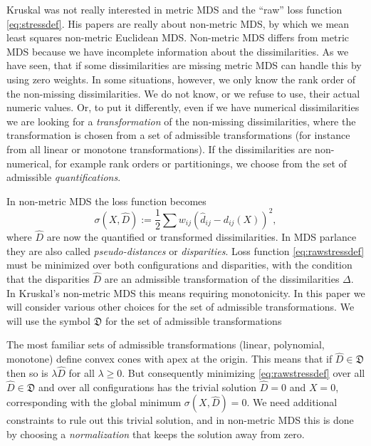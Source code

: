 \documentclass[
  12pt,
]{article}
\begin{document}
Kruskal was not really interested in metric MDS and the ``raw'' loss
function \eqref{eq:stressdef}. His papers are really about non-metric
MDS, by which we mean least squares non-metric Euclidean MDS. Non-metric
MDS differs from metric MDS because we have incomplete information about
the dissimilarities. As we have seen, that if some dissimilarities are
missing metric MDS can handle this by using zero weights. In some
situations, however, we only know the rank order of the non-missing
dissimilarities. We do not know, or we refuse to use, their actual
numeric values. Or, to put it differently, even if we have numerical
dissimilarities we are looking for a \emph{transformation} of the non-missing
dissimilarities, where the transformation is chosen from a set of
admissible transformations (for instance from all linear or monotone
transformations). If the dissimilarities are non-numerical, for example
rank orders or partitionings, we choose from the set of admissible
\emph{quantifications}.

In non-metric MDS the loss function becomes \begin{equation}
\sigma(X,\hat D):=\frac12\sum w_{ij}(\hat d_{ij}-d_{ij}(X))^2,
\label{eq:rawstressdef}
\end{equation} where \(\hat D\) are now the quantified or transformed
dissimilarities. In MDS parlance they are also called \emph{pseudo-distances}
or \emph{disparities}. Loss function \eqref{eq:rawstressdef} must be minimized
over both configurations and disparities, with the condition that the
disparities \(\hat D\) are an admissible transformation of the
dissimilarities \(\Delta\). In Kruskal's non-metric MDS this means
requiring monotonicity. In this paper we will consider various other
choices for the set of admissible transformations. We will use the
symbol \(\mathfrak{D}\) for the set of admissible transformations

The most familiar sets of admissible transformations (linear,
polynomial, monotone) define convex cones with apex at the origin. This
means that if \(\hat D\in\mathfrak{D}\) then so is \(\lambda\hat D\) for all
\(\lambda\geq 0\). But consequently minimizing \eqref{eq:rawstressdef} over
all \(\hat D\in\mathfrak{D}\) and over all configurations has the trivial
solution \(\hat D=0\) and \(X=0\), corresponding with the global minimum
\(\sigma(X,\hat D)=0\). We need additional constraints to rule out this
trivial solution, and in non-metric MDS this is done by choosing a
\emph{normalization} that keeps the solution away from zero.
\end{document}
